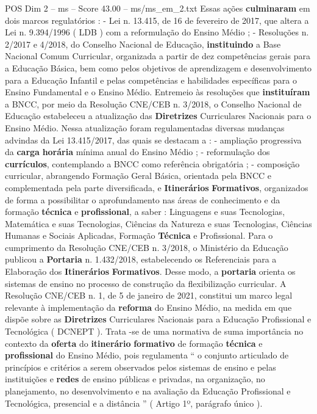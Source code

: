 \begin{textsample}{POS Dim 2 – ms – Score 43.00 – ms/ms\_em\_2.txt}
Essas ações \textbf{culminaram} em dois marcos regulatórios : - Lei n. 13.415, de 16 de fevereiro de 2017, que altera a Lei n. 9.394/1996 ( LDB ) com a reformulação do Ensino Médio ; - Resoluções n. 2/2017 e 4/2018, do Conselho Nacional de Educação, \textbf{instituindo} a Base Nacional Comum Curricular, organizada a partir de dez competências gerais para a Educação Básica, bem como pelos objetivos de aprendizagem e desenvolvimento para a Educação Infantil e pelas competências e habilidades específicas para o Ensino Fundamental e o Ensino Médio.
Entremeio às resoluções que \textbf{instituíram} a BNCC, por meio da Resolução CNE/CEB n. 3/2018, o Conselho Nacional de Educação estabeleceu a atualização das \textbf{Diretrizes} Curriculares Nacionais para o Ensino Médio.
Nessa atualização foram regulamentadas diversas mudanças advindas da Lei 13.415/2017, das quais se destacam a : - ampliação progressiva da \textbf{carga} \textbf{horária} mínima anual do Ensino Médio ; - reformulação dos \textbf{currículos}, contemplando a BNCC como referência obrigatória ; - composição curricular, abrangendo Formação Geral Básica, orientada pela BNCC e complementada pela parte diversificada, e \textbf{Itinerários} \textbf{Formativos}, organizados de forma a possibilitar o aprofundamento nas áreas de conhecimento e da formação \textbf{técnica} e \textbf{profissional}, a saber : Linguagens e suas Tecnologias, Matemática e suas Tecnologias, Ciências da Natureza e suas Tecnologias, Ciências Humanas e Sociais Aplicadas, Formação \textbf{Técnica} e Profissional.
Para o cumprimento da Resolução CNE/CEB n. 3/2018, o Ministério da Educação publicou a \textbf{Portaria} n. 1.432/2018, estabelecendo os Referenciais para a Elaboração dos \textbf{Itinerários} \textbf{Formativos}.
Desse modo, a \textbf{portaria} orienta os sistemas de ensino no processo de construção da flexibilização curricular.
A Resolução CNE/CEB n. 1, de 5 de janeiro de 2021, constitui um marco legal relevante à implementação da \textbf{reforma} do Ensino Médio, na medida em que dispõe sobre as \textbf{Diretrizes} Curriculares Nacionais para a Educação Profissional e Tecnológica ( DCNEPT ).
Trata -se de uma normativa de suma importância no contexto da \textbf{oferta} do \textbf{itinerário} \textbf{formativo} de formação \textbf{técnica} e \textbf{profissional} do Ensino Médio, pois regulamenta “ o conjunto articulado de princípios e critérios a serem observados pelos sistemas de ensino e pelas instituições e \textbf{redes} de ensino públicas e privadas, na organização, no planejamento, no desenvolvimento e na avaliação da Educação Profissional e Tecnológica, presencial e a distância ” ( Artigo 1º, parágrafo único ).

\end{textsample}
